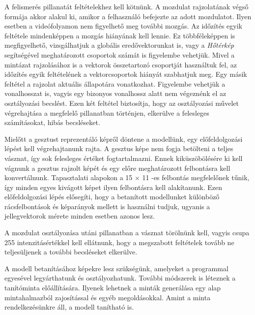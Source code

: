 A felismerés pillanatát feltételekhez kell kötnünk. A mozdulat rajzolatának végső formája akkor alakul ki, amikor a felhasználó befejezte az adott mozdulatot. Ilyen esetben a videófolyamon nem figyelhető meg további mozgás. Az időzítés egyik feltétele mindenképpen a mozgás hiányának kell lennie. Ez többféleképpen is megfigyelhető, vizsgálhatjuk a globális eredővektorunkat is, vagy a \textit{Hőtérkép} segítségével meghatározott csoportok számát is figyelembe vehetjük. Mivel a mintázat rajzolásához is a vektorok összetartozó csoportját használtuk fel, az időzítés egyik feltételének a vektorcsoportok hiányát szabhatjuk meg. Egy másik feltétel a rajzolat aktuális állapotára vonatkozhat. Figyelembe vehetjük a vonalhosszat is, vagyis egy bizonyos vonalhossz alatt nem végeznénk el az osztályozási becslést. Ezen két feltétel biztosítja, hogy az osztályozási művelet végrehajtása a megfelelő pillanatban történjen, elkerülve a felesleges számításokat, hibás becsléseket.

Mielőtt a gesztust reprezentáló képről döntene a modellünk, egy előfeldolgozási lépést kell végrehajtanunk rajta. A gesztus képe nem fogja betölteni a teljes vásznat, így sok felesleges értéket fogtartalmazni. Ennek kiküszöbölésére ki kell vágnunk a gesztus rajzolt képét és egy előre meghatározott felbontásra kell konvertálnunk. Tapasztalati alapokon a 15 $\times$ 11 -es felbontás megfelelőnek tűnik, így minden egyes kivágott képet ilyen felbontásra kell alakítanunk. Ezen előfeldolgozási lépés elősegíti, hogy a betanított modellunket különböző rácsfelbontások és képarányok mellett is használni tudjuk, ugyanis a jellegvektorok mérete minden esetben azonos lesz.

A mozdulat osztályozása utáni pillanatban a vásznat törölnünk kell, vagyis csupa 255 intenzitásértékkel kell ellátnunk, hogy a megszabott feltételek tovább ne teljesüljenek a további becsléseket elkerülve.

A modell betanításához képekre lesz szükségünk, amelyeket a programmal egyesével legyárthatunk és osztályozhatunk. További módszerek is léteznek a tanítóminta előállítására. Ilyenek lehetnek a minták generálása egy alap mintahalmazból zajosítással és egyéb megoldásokkal. Amint a minta rendelkezésünkre áll, a modell tanítható is.
